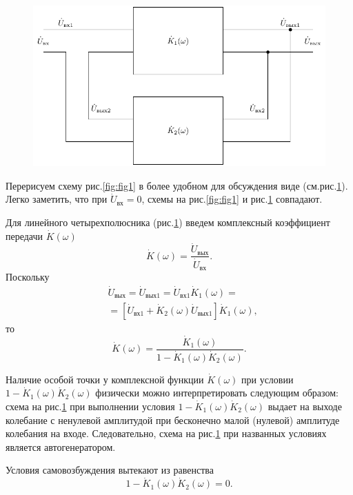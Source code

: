 \begin{figure}[h]
	\centering
	\includegraphics[width=0.6\linewidth]{circuit/two.pdf}
	\caption{}
	\label{fig:fig3}
\end{figure}

Перерисуем схему рис.\ref{fig:fig1} в более удобном для обсуждения виде (см.рис.\ref{fig:fig3}). Легко заметить, что при $\dot{U}_\text{вх}=0$, схемы на рис.\ref{fig:fig1} и рис.\ref{fig:fig3} совпадают.

Для линейного четырехполюсника (рис.\ref{fig:fig3}) введем комплексный коэффициент передачи $\dot{K}(\omega)$
\begin{equation*}
\dot{K}(\omega)=\frac{\dot{U}_\text{вых}}{\dot{U}_\text{вх}}.
\end{equation*}
Поскольку
\begin{equation*}
\begin{aligned}
&\dot{U}_\text{вых}=\dot{U}_{\text{вых}1}=\dot{U}_{\text{вх}1}\dot{K}_1(\omega)=\\
&= [\dot{U}_{\text{вх}1}+\dot{K}_2(\omega)\dot{U}_{\text{вых}1}]\dot{K}_1(\omega),
\end{aligned}
\end{equation*}
то 
\begin{equation*}
\dot{K}(\omega)=\frac{\dot{K}_1(\omega)}{1-\dot{K}_1(\omega)\dot{K}_2(\omega)}.
\end{equation*}

Наличие особой точки у комплексной функции $\dot{K}(\omega)$ при условии $1-\dot{K}_1(\omega)\dot{K}_2(\omega)$ физически можно интерпретировать следующим образом: схема на рис.\ref{fig:fig3} при выполнении условия $1-\dot{K}_1(\omega)\dot{K}_2(\omega)$ выдает на выходе колебание с ненулевой амплитудой при бесконечно малой (нулевой) амплитуде колебания на входе. Следовательно, схема  на рис.\ref{fig:fig3} при названных условиях является автогенератором.

Условия самовозбуждения вытекают из равенства
\begin{equation*}
1-\dot{K}_1(\omega)\dot{K}_2(\omega)=0.
\end{equation*}

